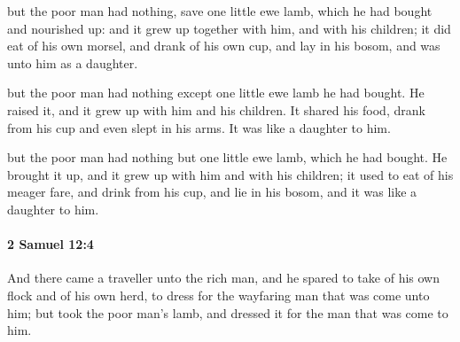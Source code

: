 			\begin{versebox}
					\item[BHS] 
					\item[ASV] but the poor man had nothing, save one little ewe lamb, which he had bought and nourished up: and it grew up together with him, and with his children; it did eat of his own morsel, and drank of his own cup, and lay in his bosom, and was unto him as a daughter.
					\item[NIV] but the poor man had nothing except one little ewe lamb he had bought. He raised it, and it grew up with him and his children. It shared his food, drank from his cup and even slept in his arms. It was like a daughter to him.
					\item[NRSV] but the poor man had nothing but one little ewe lamb, which he had bought. He brought it up, and it grew up with him and with his children; it used to eat of his meager fare, and drink from his cup, and lie in his bosom, and it was like a daughter to him.
			\end{versebox}

		\paragraph{2 Samuel 12:4} %
			\label{2SAMUEL-12-4}

			And there came a traveller unto the rich man, and he spared to take of his own flock and of his own herd, to dress for the wayfaring man that was come unto him; but took the poor man’s lamb, and dressed it for the man that was come to him.

